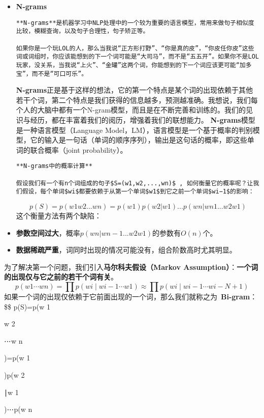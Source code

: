 \begin{itemize}
\item
  \textbf{N-grams}

\begin{verbatim}
**N-grams**是机器学习中NLP处理中的一个较为重要的语言模型，常用来做句子相似度比较，模糊查询，以及句子合理性，句子矫正等。

如果你是一个玩LOL的人，那么当我说“正方形打野”、“你是真的皮”，“你皮任你皮”这些词或词组时，你应该能想到的下一个词可能是“大司马”，而不是“五五开”。如果你不是LOL玩家，没关系，当我说“上火”、“金罐”这两个词，你能想到的下一个词应该更可能“加多宝”，而不是“可口可乐”。
\end{verbatim}

  \textbf{N-grams}正是基于这样的想法，它的第一个特点是某个词的出现依赖于其他若干个词，第二个特点是我们获得的信息越多，预测越准确。我想说，我们每个人的大脑中都有一个N-gram模型，而且是在不断完善和训练的。我们的见识与经历，都在丰富着我们的阅历，增强着我们的联想能力。
  \textbf{N-grams}模型是一种语言模型（Language
  Model，LM），语言模型是一个基于概率的判别模型，它的输入是一句话（单词的顺序序列），输出是这句话的概率，即这些单词的联合概率（joint
  probability）。

\begin{verbatim}
**N-grams中的概率计算**

假设我们有一个有n个词组成的句子$S=(w1,w2,...,wn)$ , 如何衡量它的概率呢？让我们假设，每个单词$wi$都要依赖于从第一个单词$w1$到它之前一个单词$wi−1$的影响：
\end{verbatim}

  \[
  p(S)=p(w1w2...wn)=p(w1)p(w2|w1)...p(wn|wn1...w2w1)
  \] 这个衡量方法有两个缺陷：
\item
  \textbf{参数空间过大}，概率\(p(wn|wn-1...w2w1)\)的参数有\(O(n)\)个。
\item
  \textbf{数据稀疏严重}，词同时出现的情况可能没有，组合阶数高时尤其明显。
\end{itemize}

为了解决第一个问题，我们引入\textbf{马尔科夫假设（Markov
Assumption）}：\textbf{一个词的出现仅与它之前的若干个词有关}。 \[
p(w1⋯wn)=∏p(wi∣wi−1⋯w1)≈∏p(wi∣wi−1⋯wi−N+1)
\]
如果一个词的出现仅依赖于它前面出现的一个词，那么我们就称之为~\textbf{Bi-gram}：
\$\$ p(S)=p(w 1

w 2

⋯w n

)=p(w 1

)p(w 2

∣w 1

)⋯p(w n

